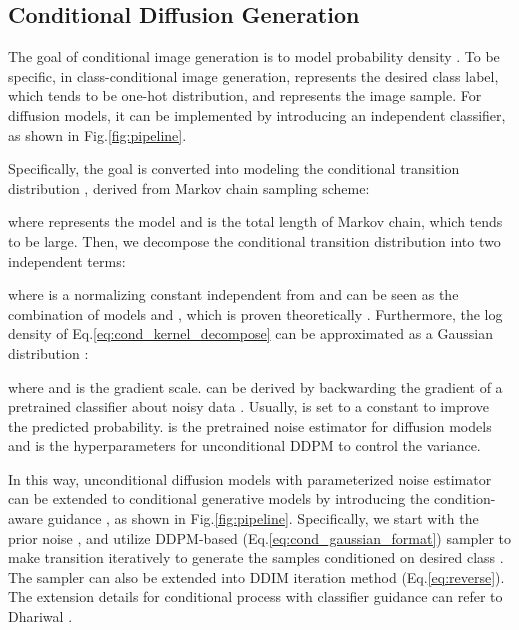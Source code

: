 \documentclass[runningheads]{llncs}
\begin{document}
\subsection{Conditional Diffusion Generation}
\label{md:cdg}









The goal of conditional image generation is to model probability density .
To be specific, in class-conditional image generation,  represents the desired class label, which tends to be one-hot distribution, and  represents the image sample.
For diffusion models, it can be implemented by introducing an independent classifier, as shown in Fig.\ref{fig:pipeline}.

Specifically, the goal is converted into modeling the conditional transition distribution , derived from Markov chain sampling scheme:

where  represents the model and  is the total length of Markov chain, which tends to be large.
Then, we decompose the conditional transition distribution into two independent terms:

where  is a normalizing constant independent from  and  can be seen as the combination of models  and ,
which is proven theoretically \cite{dickstein,dhariwal2021diffusion}.
Furthermore, the log density of Eq.\eqref{eq:cond_kernel_decompose} can be approximated as a Gaussian distribution \cite{dhariwal2021diffusion}:

where  and  is the gradient scale.
 can be derived by backwarding the gradient of a pretrained classifier about noisy data .
Usually,  is set to a constant \cite{dhariwal2021diffusion} to improve the predicted probability.
 is the pretrained noise estimator for diffusion models and 
 is the hyperparameters for unconditional DDPM to control the variance.








In this way, unconditional diffusion models with parameterized noise estimator  can be extended to conditional generative models by introducing the condition-aware guidance , 
as shown in Fig.\ref{fig:pipeline}.
Specifically, we start with the prior noise , and utilize DDPM-based (Eq.\eqref{eq:cond_gaussian_format}) sampler to make transition iteratively to generate the samples conditioned on desired class .
The sampler can also be extended into DDIM iteration method (Eq.\eqref{eq:reverse}). The extension details for conditional process with classifier guidance can refer to Dhariwal \etal \cite{sde,dhariwal2021diffusion}.
\end{document}
